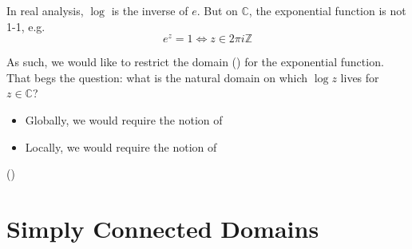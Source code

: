 \documentclass[notoc,notitlepage]{tufte-book}
\begin{document}
In real analysis, $\log$ is the inverse of $e$. But on $\mathbb{C}$, the exponential function is not 1-1, e.g.
\begin{equation*}
  e^z = 1 \iff z \in 2 \pi i \mathbb{Z}
\end{equation*}

As such, we would like to restrict the domain () for the exponential function. That begs the question: what is the natural domain on which $\log z$ lives for $z \in \mathbb{C}$?

\begin{itemize}
  \item Globally, we would require the notion of 
  \item Locally, we would require the notion of 
\end{itemize}

()


\section{Simply Connected Domains} %
\label{sec:simply_connected_domains}
\end{document}
